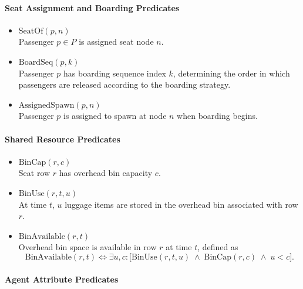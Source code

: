 \documentclass[11pt,a4paper]{article}
\begin{document}
\paragraph{Seat Assignment and Boarding Predicates}

\begin{itemize}

\item $\text{SeatOf}(p,n)$\\
Passenger $p \in P$ is assigned seat node $n$.

\item $\text{BoardSeq}(p,k)$\\
Passenger $p$ has boarding sequence index $k$, determining the order in which passengers are released according to the boarding strategy.

\item $\text{AssignedSpawn}(p,n)$\\
Passenger $p$ is assigned to spawn at node $n$ when boarding begins.

\end{itemize}

\paragraph{Shared Resource Predicates}

\begin{itemize}

\item $\text{BinCap}(r,c)$\\
Seat row $r$ has overhead bin capacity $c$.

\item $\text{BinUse}(r,t,u)$\\
At time $t$, $u$ luggage items are stored in the overhead bin associated with row $r$.

\item $\text{BinAvailable}(r,t)$\\
Overhead bin space is available in row $r$ at time $t$, defined as
\[
\text{BinAvailable}(r,t) \iff \exists u,c:\bigl[\text{BinUse}(r,t,u) \;\wedge\; \text{BinCap}(r,c) \;\wedge\; u < c\bigr].
\]

\end{itemize}

\paragraph{Agent Attribute Predicates}
\end{document}
